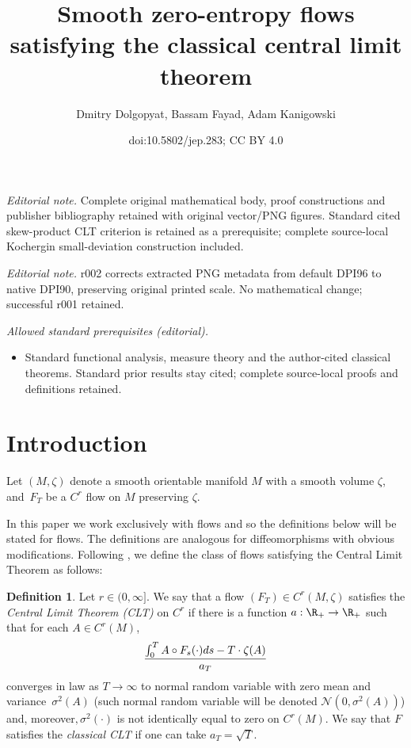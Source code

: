 \documentclass[10pt]{amsart}
\title{Smooth zero-entropy flows satisfying the classical central limit theorem}
\author{Dmitry Dolgopyat, Bassam Fayad, Adam Kanigowski}
\date{doi:10.5802/jep.283; CC BY 4.0}
\let\DS\relax
\newcommand\cN{\mathcal{N}}
\theoremstyle{definition}
\newtheorem{definition}{Definition}
\theoremstyle{plain}
\begin{document}
\maketitle
\noindent\textit{Editorial note.} Complete original mathematical body, proof constructions and publisher bibliography retained with original vector/PNG figures. Standard cited skew-product CLT criterion is retained as a prerequisite; complete source-local Kochergin small-deviation construction included.\par\medskip
\noindent\textit{Editorial note.} r002 corrects extracted PNG metadata from default DPI96 to native DPI90, preserving original printed scale. No mathematical change; successful r001 retained.\par\medskip
\noindent\textit{Allowed standard prerequisites (editorial).}\begin{itemize}
\item Standard functional analysis, measure theory and the author-cited classical theorems. Standard prior results stay cited; complete source-local proofs and definitions retained.
\end{itemize}\medskip

\tableofcontents


\section{Introduction}

Let $(M,\zeta)$ denote a smooth orientable manifold $M$ with a smooth volume $\zeta$, and~$F_T$ be a $C^r$ flow on $M$ preserving $\zeta$.

In this paper we work exclusively with flows and so the definitions below will be stated for flows. The definitions are analogous for diffeomorphisms with obvious modifications. Following \cite{DDKN}, we define the class of flows satisfying the Central Limit Theorem as follows:

\begin{definition}
\label{DefCLT} Let $r\in (0,\infty]$. We say that a flow $(F_T)\in C^r(M,\zeta)$ satisfies the
\emph{Central Limit Theorem (CLT)} on $C^r$ if
there is a function $a:\R_+\to \R_+$ such that
for each $A \in C^r(M)$,
\[
\frac{\DS \int_{0}^{T}A\circ F_s(\cdot)ds-T\cdot \zeta(A)}{a_T}
\] converges in law as $T\to\infty$
to normal random variable with zero mean and variance~$\sigma^2(A)$
(such normal random variable will be denoted $\cN(0, \sigma^2(A))$) and, moreover$,\sigma^2(\cdot)$
is not identically equal to zero on $C^r(M)$.
We say that $F$ satisfies the \emph{classical CLT}
if one can take $a_T=\sqrt{T}$.
\end{definition}
\end{document}
